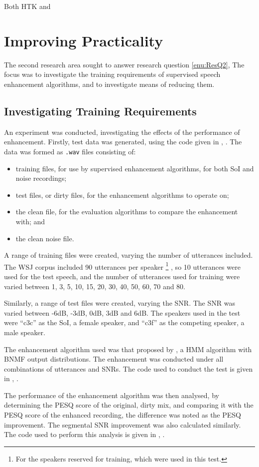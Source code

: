 Both \ac{HTK} and 


\section{Improving Practicality}

The second research area sought to answer research question \ref{enu:ResQ2},
\textit{\RQtwo{}} The focus was to investigate the training requirements
of supervised speech enhancement algorithms, and to investigate means
of reducing them.


\subsection{\label{sub:Investigating-Training-Req}Investigating Training Requirements}

An experiment was conducted, investigating the effects of the performance
of enhancement. Firstly, test data was generated, using the code given
in , \textit{}.
The data was formed as \lstinline[language=bash]!.wav! files consisting
of:
\begin{itemize}
\item training files, for use by supervised enhancement algorithms, for
both \ac{SoI} and noise recordings;
\item test files, or dirty files, for the enhancement algorithms to operate
on;
\item the clean file, for the evaluation algorithms to compare the enhancement
with; and
\item the clean noise file.
\end{itemize}
A range of training files were created, varying the number of utterances
included. The \ac{WSJ} corpus included 90 utterances per speaker%
\footnote{For the speakers reserved for training, which were used in this test.%
} \citep{Fransen1994}, so 10 utterances were used for the test speech,
and the number of utterances used for training were varied between
1, 3, 5, 10, 15, 20, 30, 40, 50, 60, 70 and 80.

Similarly, a range of test files were created, varying the \ac{SNR}.
The \ac{SNR} was varied between -6dB, -3dB, 0dB, 3dB and 6dB. The
speakers used in the test were ``c3c'' as the \ac{SoI}, a female
speaker, and ``c3f'' as the competing speaker, a male speaker.

The enhancement algorithm used was that proposed by \citet{mohammadiha2013supervised},
a \ac{HMM} algorithm with \ac{BNMF} output distributions. The enhancement
was conducted under all combinations of utterances and \acp{SNR}.
The code used to conduct the test is given in ,
\textit{}.

The performance of the enhancement algorithm was then analysed, by
determining the \ac{PESQ} score of the original, dirty mix, and comparing
it with the \ac{PESQ} score of the enhanced recording, the difference
was noted as the \ac{PESQ} improvement. The segmental \ac{SNR} improvement
was also calculated similarly. The code used to perform this analysis
is given in , \textit{}.%

